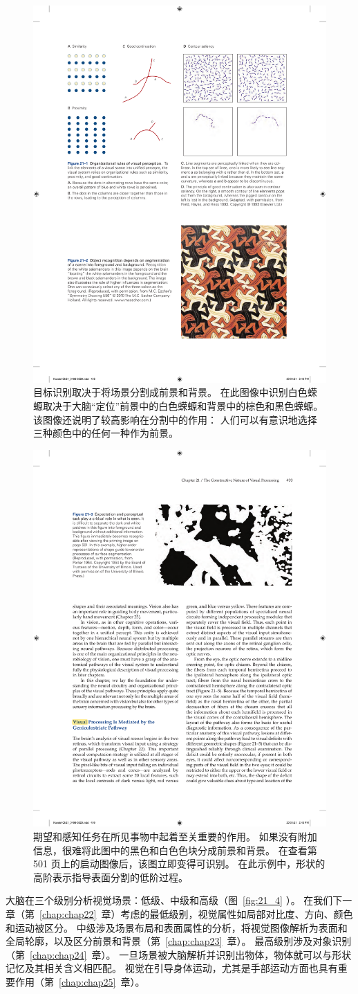 \begin{figure}[htbp]
	\centering
	\includegraphics[width=0.5\linewidth]{chap21/fig_21_2}
	\caption{目标识别取决于将场景分割成前景和背景。
		在此图像中识别白色蝾螈取决于大脑“定位”前景中的白色蝾螈和背景中的棕色和黑色蝾螈。
		该图像还说明了较高影响在分割中的作用：
		人们可以有意识地选择三种颜色中的任何一种作为前景。}
	\label{fig:21_2}
\end{figure}


\begin{figure}[htbp]
	\centering
	\includegraphics[width=0.5\linewidth]{chap21/fig_21_3}
	\caption{期望和感知任务在所见事物中起着至关重要的作用。
		如果没有附加信息，很难将此图中的黑色和白色色块分成前景和背景。
		在查看第 501 页上的启动图像后，该图立即变得可识别。
		在此示例中，形状的高阶表示指导表面分割的低阶过程。}
	\label{fig:21_3}
\end{figure}


大脑在三个级别分析视觉场景：低级、中级和高级（图~\ref{fig:21_4} ）。
在我们下一章（第~\ref{chap:chap22}~章）考虑的最低级别，视觉属性如局部对比度、方向、颜色和运动被区分。
中级涉及场景布局和表面属性的分析，将视觉图像解析为表面和全局轮廓，以及区分前景和背景（第~\ref{chap:chap23}~章）。
最高级别涉及对象识别（第~\ref{chap:chap24}~章）。
一旦场景被大脑解析并识别出物体，物体就可以与形状记忆及其相关含义相匹配。
视觉在引导身体运动，尤其是手部运动方面也具有重要作用（第~\ref{chap:chap25}~章）。



